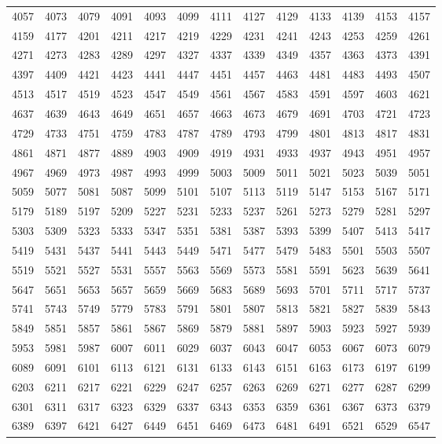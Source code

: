 \documentclass[12pt, a6paper]{extarticle}
\begin{document}
\begin{longtable}{lllll lllll lll}
4057 &4073 &4079 &4091 &4093 &4099 &4111 &4127 &4129 &4133 &4139 &4153 &4157 \\
4159 &4177 &4201 &4211 &4217 &4219 &4229 &4231 &4241 &4243 &4253 &4259 &4261 \\
4271 &4273 &4283 &4289 &4297 &4327 &4337 &4339 &4349 &4357 &4363 &4373 &4391 \\
4397 &4409 &4421 &4423 &4441 &4447 &4451 &4457 &4463 &4481 &4483 &4493 &4507 \\
4513 &4517 &4519 &4523 &4547 &4549 &4561 &4567 &4583 &4591 &4597 &4603 &4621 \\
4637 &4639 &4643 &4649 &4651 &4657 &4663 &4673 &4679 &4691 &4703 &4721 &4723 \\
4729 &4733 &4751 &4759 &4783 &4787 &4789 &4793 &4799 &4801 &4813 &4817 &4831 \\
4861 &4871 &4877 &4889 &4903 &4909 &4919 &4931 &4933 &4937 &4943 &4951 &4957 \\
4967 &4969 &4973 &4987 &4993 &4999 &5003 &5009 &5011 &5021 &5023 &5039 &5051 \\
5059 &5077 &5081 &5087 &5099 &5101 &5107 &5113 &5119 &5147 &5153 &5167 &5171 \\
5179 &5189 &5197 &5209 &5227 &5231 &5233 &5237 &5261 &5273 &5279 &5281 &5297 \\
5303 &5309 &5323 &5333 &5347 &5351 &5381 &5387 &5393 &5399 &5407 &5413 &5417 \\
5419 &5431 &5437 &5441 &5443 &5449 &5471 &5477 &5479 &5483 &5501 &5503 &5507 \\
5519 &5521 &5527 &5531 &5557 &5563 &5569 &5573 &5581 &5591 &5623 &5639 &5641 \\
5647 &5651 &5653 &5657 &5659 &5669 &5683 &5689 &5693 &5701 &5711 &5717 &5737 \\
5741 &5743 &5749 &5779 &5783 &5791 &5801 &5807 &5813 &5821 &5827 &5839 &5843 \\
5849 &5851 &5857 &5861 &5867 &5869 &5879 &5881 &5897 &5903 &5923 &5927 &5939 \\
5953 &5981 &5987 &6007 &6011 &6029 &6037 &6043 &6047 &6053 &6067 &6073 &6079 \\
6089 &6091 &6101 &6113 &6121 &6131 &6133 &6143 &6151 &6163 &6173 &6197 &6199 \\
6203 &6211 &6217 &6221 &6229 &6247 &6257 &6263 &6269 &6271 &6277 &6287 &6299 \\
6301 &6311 &6317 &6323 &6329 &6337 &6343 &6353 &6359 &6361 &6367 &6373 &6379 \\
6389 &6397 &6421 &6427 &6449 &6451 &6469 &6473 &6481 &6491 &6521 &6529 &6547 \\

\end{longtable}
\end{document}
